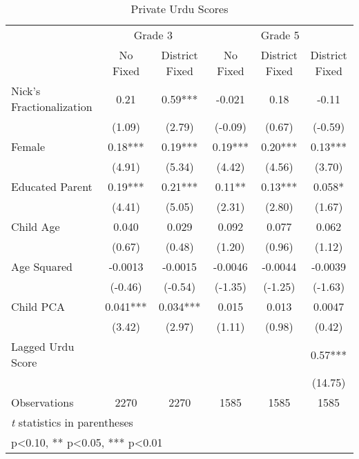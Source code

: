 \begin{table}[htbp]\centering
\def\sym#1{\ifmmode^{#1}\else\(^{#1}\)\fi}
\caption{Private Urdu Scores}
\begin{tabular}{l*{5}{c}}
\toprule
                &\multicolumn{2}{c}{Grade 3}&\multicolumn{3}{c}{Grade 5}           \\\cmidrule(lr){2-3}\cmidrule(lr){4-6}
                &\multicolumn{1}{c}{No Fixed}&\multicolumn{1}{c}{District Fixed}&\multicolumn{1}{c}{No Fixed}&\multicolumn{1}{c}{District Fixed}&\multicolumn{1}{c}{District Fixed}\\
\midrule
Nick's Fractionalization&     0.21   &     0.59***&   -0.021   &     0.18   &    -0.11   \\
                &   (1.09)   &   (2.79)   &  (-0.09)   &   (0.67)   &  (-0.59)   \\
Female          &     0.18***&     0.19***&     0.19***&     0.20***&     0.13***\\
                &   (4.91)   &   (5.34)   &   (4.42)   &   (4.56)   &   (3.70)   \\
Educated Parent &     0.19***&     0.21***&     0.11** &     0.13***&    0.058*  \\
                &   (4.41)   &   (5.05)   &   (2.31)   &   (2.80)   &   (1.67)   \\
Child Age       &    0.040   &    0.029   &    0.092   &    0.077   &    0.062   \\
                &   (0.67)   &   (0.48)   &   (1.20)   &   (0.96)   &   (1.12)   \\
Age Squared     &  -0.0013   &  -0.0015   &  -0.0046   &  -0.0044   &  -0.0039   \\
                &  (-0.46)   &  (-0.54)   &  (-1.35)   &  (-1.25)   &  (-1.63)   \\
Child PCA       &    0.041***&    0.034***&    0.015   &    0.013   &   0.0047   \\
                &   (3.42)   &   (2.97)   &   (1.11)   &   (0.98)   &   (0.42)   \\
Lagged Urdu Score&            &            &            &            &     0.57***\\
                &            &            &            &            &  (14.75)   \\
\midrule
Observations    &     2270   &     2270   &     1585   &     1585   &     1585   \\
\bottomrule
\multicolumn{6}{l}{\footnotesize \textit{t} statistics in parentheses}\\
\multicolumn{6}{l}{\footnotesize * p<0.10, ** p<0.05, *** p<0.01}\\
\end{tabular}
\end{table}
